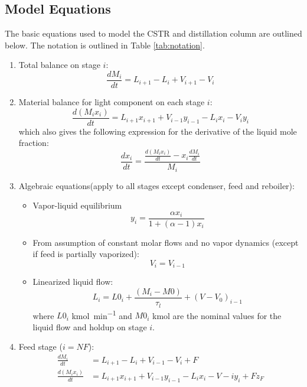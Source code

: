 \subsection{Model Equations}
The basic equations used to model the CSTR and distillation column are outlined below.
The notation is outlined in Table \ref{tab:notation}.
\begin{enumerate}[label = \roman*)]
	\item Total balance on stage $i$:
		\begin{equation}
			\frac{dM_i}{dt}=L_{i+1}-L_i+V_{i+1}-V_i
		\end{equation}
	\item Material balance for light component on each stage $i$:
		\begin{equation}
			\frac{d(M_ix_i)}{dt}=L_{i+1}x_{i+1}+V_{i-1}y_{i-1}-L_ix_i-V_iy_i
		\end{equation}
		which also gives the following expression for the derivative of the liquid mole fraction:
		\begin{equation}
			\frac{dx_i}{dt}=\frac{\frac{d(M_ix_i)}{dt}-x_i\frac{dM_i}{dt}}{M_i}
		\end{equation}
	\item Algebraic equations(apply to all stages except condenser, feed and reboiler):
		\begin{itemize}
			\item Vapor-liquid equilibrium
				\begin{equation}
					y_i =\frac{ \alpha x_i}{1+(\alpha-1)x_i}
				\end{equation}
			\item From assumption of constant molar flows and no vapor dynamics (except if feed is partially vaporized):
				\begin{equation}
					V_i=V_{i-1}
				\end{equation}
			\item Linearized liquid flow:
				\begin{equation}
					L_i= L0_i+\frac{(M_i-M0)}{\tau_l}+(V-V_0)_{i-1}
				\end{equation}
				where $L0_i$ \si{\kilo\mole\per\minute} and $M0_i$ \si{\kilo\mole} are the nominal values for the liquid flow and holdup on stage $i$.
		\end{itemize}
	\item Feed stage ($i = NF$):
		\begin{align}
			\frac{dM_i}{dt}&=L_{i+1} -L_i+V_{i-1}-V_i+F\\
			\frac{d(M_ix_i)}{dt}&= L_{i+1}x_{i+1}+V_{i-1}y_{i-1}-L_ix_i-V-iy_i+Fz_F

\end{align}
\end{enumerate}

